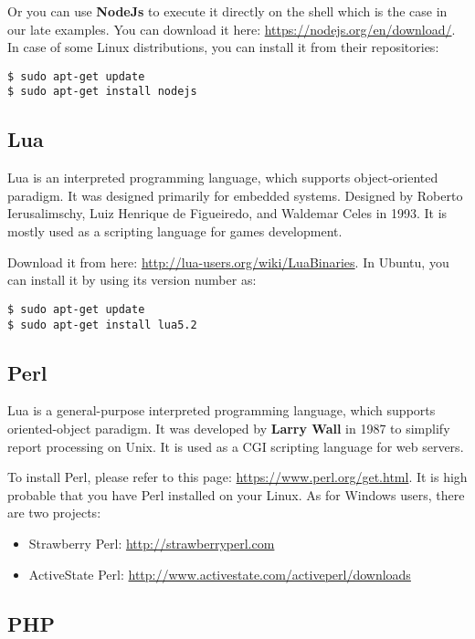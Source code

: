 \documentclass{KodeBook}
\begin{document}
Or you can use \textbf{NodeJs} to execute it directly on the shell which is the case in our late examples. 
You can download it here: \url{https://nodejs.org/en/download/}. 
In case of some Linux distributions, you can install it from their repositories:
\begin{lstlisting}[style=shellStyle]
$ sudo apt-get update
$ sudo apt-get install nodejs
\end{lstlisting}

\subsection{Lua}

Lua is an interpreted programming language, which supports object-oriented paradigm. 
It was designed primarily for embedded systems.
Designed by Roberto Ierusalimschy, Luiz Henrique de Figueiredo, and Waldemar Celes in 1993.
It is mostly used as a scripting language for games development.

Download it from here: \url{http://lua-users.org/wiki/LuaBinaries}. 
In Ubuntu, you can install it by using its version number as:
\begin{lstlisting}[style=shellStyle]
$ sudo apt-get update
$ sudo apt-get install lua5.2
\end{lstlisting}


\subsection{Perl}

Lua is a general-purpose interpreted programming language, which supports oriented-object paradigm. 
It was developed by \textbf{Larry Wall} in 1987 to simplify report processing on Unix.
It is used as a CGI scripting language for web servers.

To install Perl, please refer to this page: \url{https://www.perl.org/get.html}. 
It is high probable that you have Perl installed on your Linux. 
As for Windows users, there are two projects: 
\begin{itemize}
	\item Strawberry Perl: \url{http://strawberryperl.com}
	\item ActiveState Perl: \url{http://www.activestate.com/activeperl/downloads}
\end{itemize}

\subsection{PHP}
\end{document}
